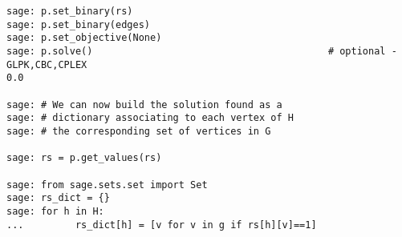 \begin{lstlisting}
sage: p.set_binary(rs)
sage: p.set_binary(edges)
sage: p.set_objective(None)
sage: p.solve()                                         # optional - GLPK,CBC,CPLEX
0.0

sage: # We can now build the solution found as a
sage: # dictionary associating to each vertex of H
sage: # the corresponding set of vertices in G

sage: rs = p.get_values(rs)

sage: from sage.sets.set import Set
sage: rs_dict = {}
sage: for h in H:
...         rs_dict[h] = [v for v in g if rs[h][v]==1]
\end{lstlisting}
